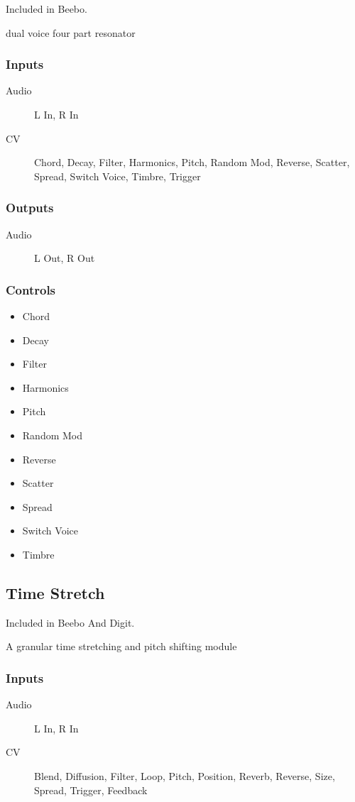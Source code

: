 Included in Beebo.

dual voice four part resonator



\subsubsection{Inputs}
\begin{description}
\item [Audio] L In, R In
\item [CV] Chord, Decay, Filter, Harmonics, Pitch, Random Mod, Reverse, Scatter, Spread, Switch Voice, Timbre, Trigger
\end{description}

\subsubsection{Outputs}
\begin{description}
\item [Audio] L Out, R Out
\end{description}

\subsubsection{Controls}
\begin{itemize}
\item Chord
\item Decay
\item Filter
\item Harmonics
\item Pitch
\item Random Mod
\item Reverse
\item Scatter
\item Spread
\item Switch Voice
\item Timbre
\end{itemize}

\subsection{Time Stretch}

Included in Beebo And Digit.

A granular time stretching and pitch shifting module



\subsubsection{Inputs}
\begin{description}
\item [Audio] L In, R In
\item [CV] Blend, Diffusion, Filter, Loop, Pitch, Position, Reverb, Reverse, Size, Spread, Trigger, Feedback
\end{description}

